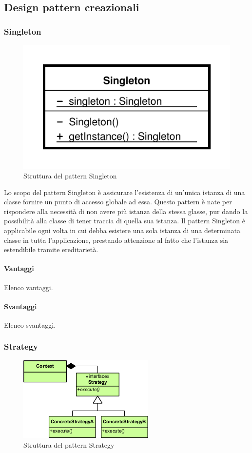 \documentclass[../SpecificaTecnica.tex]{subfiles}
\begin{document}
	\subsection{Design pattern creazionali}
		\subsubsection{Singleton}
			\begin{figure}[!h]
				\centering
				\includegraphics[scale=0.5]{pattern/singleton}
				\caption{Struttura del pattern Singleton}
				\label{fig:Struttura_Singleton}
			\end{figure}
			
			Lo scopo del pattern Singleton è assicurare l'esistenza di un'unica istanza di una classe fornire un punto di accesso globale ad essa. Questo pattern è nate per rispondere alla necessità di non avere più istanza della stessa glasse, pur dando la possibilità alla classe di tener traccia di quella sua istanza. Il pattern Singleton è applicabile ogni volta in cui debba esistere una sola istanza di una determinata classe in tutta l'applicazione, prestando attenzione al fatto che l'istanza sia estendibile tramite ereditarietà.
			\paragraph{Vantaggi}
				Elenco vantaggi.
			\paragraph{Svantaggi}
				Elenco svantaggi.
				
		\subsubsection{Strategy}
			\begin{figure}[!h]
				\centering
				\includegraphics[scale=0.7]{pattern/strategy}
				\caption{Struttura del pattern Strategy}
				\label{fig:Struttura_Strategy}
			\end{figure}
			
\end{document}
